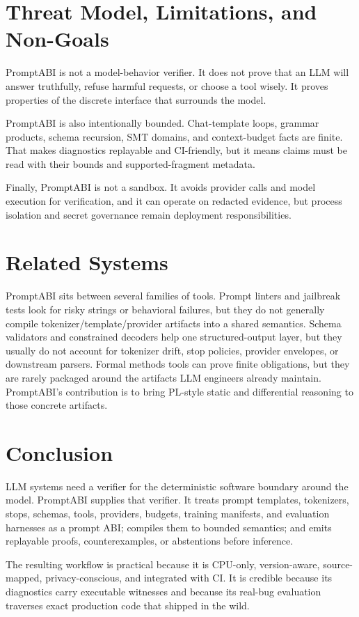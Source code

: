 \documentclass[10pt]{article}
\begin{document}
\section{Threat Model, Limitations, and Non-Goals}

PromptABI is not a model-behavior verifier. It does not prove that an LLM will
answer truthfully, refuse harmful requests, or choose a tool wisely. It proves
properties of the discrete interface that surrounds the model.

PromptABI is also intentionally bounded. Chat-template loops, grammar products,
schema recursion, SMT domains, and context-budget facts are finite. That makes
diagnostics replayable and CI-friendly, but it means claims must be read with
their bounds and supported-fragment metadata.

Finally, PromptABI is not a sandbox. It avoids provider calls and model
execution for verification, and it can operate on redacted evidence, but process
isolation and secret governance remain deployment responsibilities.

\section{Related Systems}

PromptABI sits between several families of tools. Prompt linters and jailbreak
tests look for risky strings or behavioral failures, but they do not generally
compile tokenizer/template/provider artifacts into a shared semantics. Schema
validators and constrained decoders help one structured-output layer, but they
usually do not account for tokenizer drift, stop policies, provider envelopes,
or downstream parsers. Formal methods tools can prove finite obligations, but
they are rarely packaged around the artifacts LLM engineers already maintain.
PromptABI's contribution is to bring PL-style static and differential reasoning
to those concrete artifacts.

\section{Conclusion}

LLM systems need a verifier for the deterministic software boundary around the
model. PromptABI supplies that verifier. It treats prompt templates,
tokenizers, stops, schemas, tools, providers, budgets, training manifests, and
evaluation harnesses as a prompt ABI; compiles them to bounded semantics; and
emits replayable proofs, counterexamples, or abstentions before inference.

The resulting workflow is practical because it is CPU-only, version-aware,
source-mapped, privacy-conscious, and integrated with CI. It is credible because
its diagnostics carry executable witnesses and because its real-bug evaluation
traverses exact production code that shipped in the wild.
\end{document}
